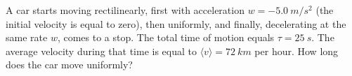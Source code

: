 
\item A car starts moving rectilinearly, first with acceleration $w = -5.0\ m/s^2$ (the initial velocity is equal to zero), then uniformly, and finally, decelerating at the same rate $w$, comes to a stop. The total time of motion equals $\tau = 25\ s$. The average velocity during that time is equal to $\langle v \rangle = 72\ km$ per hour. How long does the car move uniformly?
